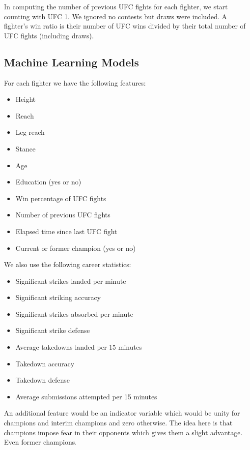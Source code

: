 In computing the number of previous UFC fights for each fighter, we start
counting with UFC 1. We ignored no contests but draws were included. A fighter's
win ratio is their number of UFC wins divided by their
total number of UFC fights (including draws).

\subsection*{Machine Learning Models}

For each fighter we have the following features:

\begin{itemize}[noitemsep]
  \item Height
  \item Reach
  \item Leg reach
  \item Stance
  \item Age
  \item Education (yes or no)
  \item Win percentage of UFC fights
  \item Number of previous UFC fights
  \item Elapsed time since last UFC fight
  \item Current or former champion (yes or no)
\end{itemize}

\noindent
We also use the following career statistics:

\begin{itemize}[noitemsep]
  \item Significant strikes landed per minute
  \item Significant striking accuracy
  \item Significant strikes absorbed per minute
  \item Significant strike defense
  \item Average takedowns landed per 15 minutes
  \item Takedown accuracy
  \item Takedown defense
  \item Average submissions attempted per 15 minutes
\end{itemize}

An additional feature would be an indicator variable
which would be unity for champions and interim champions
and zero otherwise. The idea here is that champions
impose fear in their opponents which gives them a slight
advantage. Even former champions.


